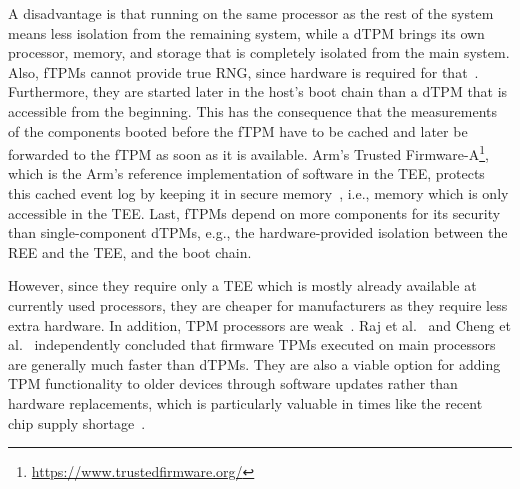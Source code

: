 A disadvantage is that running on the same processor as the rest of the system means less isolation from the remaining system, while a \ac{dTPM} brings its own processor, memory, and storage that is completely isolated from the main system. 
Also, \acp{fTPM} cannot provide true RNG, since hardware is required for that~\cite{Stipcevic2014}.
Furthermore, they are started later in the host's boot chain than a dTPM that is accessible from the beginning.
This has the consequence that the measurements of the components booted before the fTPM have to be cached and later be forwarded to the \ac{fTPM} as soon as it is available.
Arm's Trusted Firmware-A\footnote{\url{https://www.trustedfirmware.org/}}, which is the Arm's reference implementation of software in the \ac{TEE}, protects this cached event log by keeping it in secure memory~\cite{tf-a-measured-boot}, i.e., memory which is only accessible in the \ac{TEE}. 
Last, fTPMs depend on more components for its security than single-component dTPMs, e.g., the hardware-provided isolation between the \ac{REE} and the \ac{TEE}, and the boot chain.


However, since they require only a TEE which is mostly already available at currently used processors, they are cheaper for manufacturers as they require less extra hardware.
In addition, TPM processors are weak~\cite{Goh2013, Raj2015}.
Raj et al.~\cite{Raj2015} and Cheng et al.~\cite{Cheng2020} independently concluded that firmware TPMs executed on main processors are generally much faster than \acp{dTPM}.
They are also a viable option for adding TPM functionality to older devices through software updates rather than hardware replacements, which is particularly valuable in times like the recent chip supply shortage~\cite{Voas2021, casper2021}.




